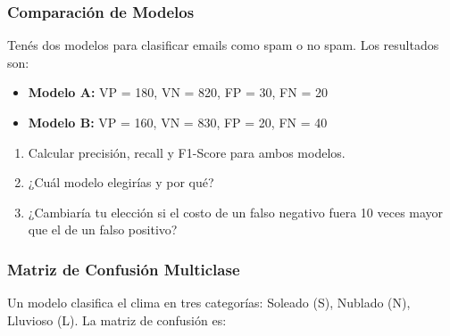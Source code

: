 \documentclass[12pt]{article}
\begin{document}
\subsubsection{Comparación de Modelos}

Tenés dos modelos para clasificar emails como spam o no spam. Los resultados son: 
\begin{itemize}
    \item \textbf{Modelo A:} VP = 180, VN = 820, FP = 30, FN = 20
    \item \textbf{Modelo B:} VP = 160, VN = 830, FP = 20, FN = 40
\end{itemize}

\begin{enumerate}
    \item[a.] Calcular precisión, recall y F1-Score para ambos modelos.
    \item[b.] ¿Cuál modelo elegirías y por qué?
    \item[c.] ¿Cambiaría tu elección si el costo de un falso negativo fuera 10 veces mayor que el de un falso positivo?
\end{enumerate}

\subsubsection{Matriz de Confusión Multiclase}

Un modelo clasifica el clima en tres categorías: Soleado (S), Nublado (N), Lluvioso (L). La matriz de confusión es:

\begin{center}
\end{center}
\end{document}
